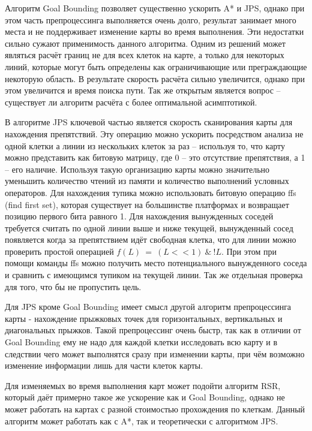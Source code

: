 Алгоритм Goal Bounding позволяет существенно ускорить A* и JPS, однако при этом часть препроцессинга выполняется очень долго, результат занимает много места и не поддерживает изменение карты во время выполнения. Эти недостатки сильно сужают применимость данного алгоритма. Одним из решений может являться расчёт границ не для всех клеток на карте, а только для некоторых линий, которые могут быть определены как ограничивающие или преграждающие некоторую область. В результате скорость расчёта сильно увеличится, однако при этом увеличится и время поиска пути. Так же открытым является вопрос -- существует ли алгоритм расчёта с более оптимальной асимптотикой.

В алгоритме JPS ключевой частью является скорость сканирования карты для нахождения препятствий. Эту операцию можно ускорить посредством анализа не одной клетки а линии из нескольких клеток за раз -- используя то, что карту можно представить как битовую матрицу, где 0 -- это отсутствие препятствия, а 1 -- его наличие. Используя такую организацию карты можно значительно уменьшить количество чтений из памяти и количество выполнений условных операторов. Для нахождения тупика можно использовать битовую операцию ffs (find first set), которая существует на большинстве платформах и возвращает позицию первого бита равного 1. Для нахождения вынужденных соседей требуется считать по одной линии выше и ниже текущей, вынужденный сосед появляется когда за препятствием идёт свободная клетка, что для линии можно проверить простой операцией $f(L)\ =\ (L<<1)\ \&\ !L$. При этом при помощи команды ffs можно получить место потенциального вынужденного соседа и сравнить с имеющимся тупиком на текущей линии. Так же отдельная проверка для того, что бы не пропустить цель.

Для JPS кроме Goal Bounding имеет смысл другой алгоритм препроцессинга карты - нахождение прыжковых точек для горизонтальных, вертикальных и диагональных прыжков. Такой препроцессинг очень быстр, так как в отличии от Goal Bounding ему не надо для каждой клетки исследовать всю карту и в следствии чего может выполнятся сразу при изменении карты, при чём возможно изменение информации лишь для части клеток карты.

Для изменяемых во время выполнения карт может подойти алгоритм RSR, который даёт примерно такое же ускорение как и Goal Bounding, однако не может работать на картах с разной стоимостью прохождения по клеткам. Данный алгоритм может работать как с A*, так и теоретически с алгоритмом JPS.